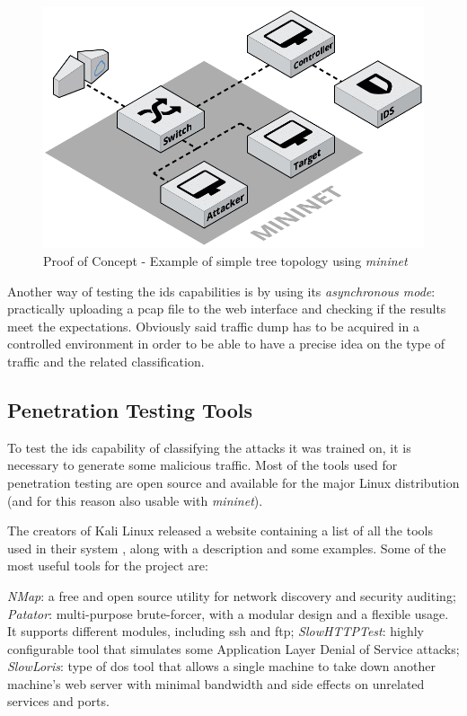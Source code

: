 \begin{figure}[h!]
    \centering
    \includegraphics[scale=0.25]{assets/figures/chapter3/PoC_topology.png}
    \caption{Proof of Concept - Example of simple tree topology using \textit{mininet}}
    \label{fig:poc-topology}
\end{figure}
Another way of testing the \gls{ids} capabilities is by using its \textit{asynchronous mode}: practically uploading a \gls{pcap} file to the web interface and checking if the results meet the expectations. Obviously said traffic dump has to be acquired in a controlled environment in order to be able to have a precise idea on the type of traffic and the related classification.


\subsection{Penetration Testing Tools}
\label{subsec:pentesting-tools}
To test the \gls{ids} capability of classifying the attacks it was trained on, it is necessary to generate some malicious traffic. Most of the tools used for penetration testing are open source and available for the major Linux distribution (and for this reason also usable with \textit{mininet}). 
\par The creators of Kali Linux \cite{KaliLinuxWebsite} released a website containing a list of all the tools used in their system \cite{KaliToolsWebsite}, along with a description and some examples. Some of the most useful tools for the project are:

\begin{itemize}
  \itemAR \textit{NMap}: a free and open source utility for network discovery and security auditing;
  \itemAR \textit{Patator}: multi-purpose brute-forcer, with a modular design and a flexible usage. It supports different modules, including \gls{ssh} and \gls{ftp};
  \itemAR \textit{SlowHTTPTest}: highly configurable tool that simulates some Application Layer Denial of Service attacks;
  \itemAR \textit{SlowLoris}: type of \gls{dos} tool that allows a single machine to take down another machine's web server with minimal bandwidth and side effects on unrelated services and ports.
\end{itemize}

